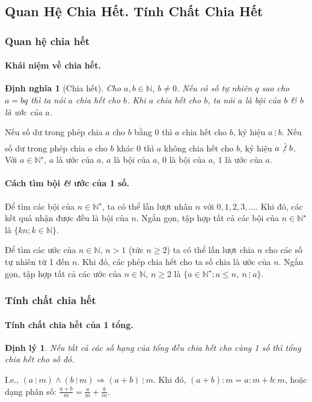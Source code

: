 \documentclass{article}
\numberwithin{equation}{section}
\newtheorem{dinhnghia}{Định nghĩa}[section]
\newtheorem{dinhly}{Định lý}[section]
\begin{document}

\subsection{Quan Hệ Chia Hết. Tính Chất Chia Hết}

\subsubsection{Quan hệ chia hết}

\paragraph{Khái niệm về chia hết.}
\begin{dinhnghia}[Chia hết]
	Cho $a,b\in\mathbb{N}$, $b\ne 0$. Nếu có số tự nhiên $q$ sao cho $a = bq$ thì ta nói \emph{$a$ chia hết cho $b$}. Khi $a$ chia hết cho $b$, ta nói $a$ là \emph{bội} của $b$ \textit{\&} $b$ là \emph{ước} của $a$.
\end{dinhnghia}
Nếu số dư trong phép chia $a$ cho $b$ bằng 0 thì $a$ chia hết cho $b$, ký hiệu $a\ \vdots\ b$. Nếu số dư trong phép chia $a$ cho $b$ khác 0 thì $a$ không chia hết cho $b$, ký hiệu $a\not\vdots\ b$. Với $a\in\mathbb{N}^\star$, $a$ là ước của $a$, $a$ là bội của $a$, 0 là bội của $a$, $1$ là ước của $a$.

\paragraph{Cách tìm bội \textit{\&} ước của 1 số.} Để tìm các bội của $n\in\mathbb{N}^\star$, ta có thể lần lượt nhân $n$ với $0,1,2,3,\ldots$. Khi đó, các kết quả nhận được đều là bội của $n$. Ngắn gọn, tập hợp tất cả các bội của $n\in\mathbb{N}^\star$ là $\{kn;k\in\mathbb{N}\}$.

Để tìm các ước của $n\in\mathbb{N}$, $n > 1$ (tức $n\ge 2$) ta có thể lần lượt chia $n$ cho các số tự nhiên từ 1 đến $n$. Khi đó, các phép chia hết cho ta số chia là ước của $n$. Ngắn gọn, tập hợp tất cả các ước của $n\in\mathbb{N}$, $n\ge 2$ là $\{a\in\mathbb{N}^\star;a\le n,\ n\ \vdots\ a\}$.

\subsubsection{Tính chất chia hết}

\paragraph{Tính chất chia hết của 1 tổng.}
\begin{dinhly}
	Nếu tất cả các số hạng của tổng đều chia hết cho cùng 1 số thì tổng chia hết cho số đó.
\end{dinhly}
I.e., $(a\ \vdots\ m)\land(b\ \vdots\ m)\Rightarrow(a + b)\ \vdots\ m$. Khi đó, $(a + b):m = a:m + b:m$, hoặc dạng phân số: $\frac{a + b}{m} = \frac{a}{m} + \frac{b}{m}$.
\end{document}
